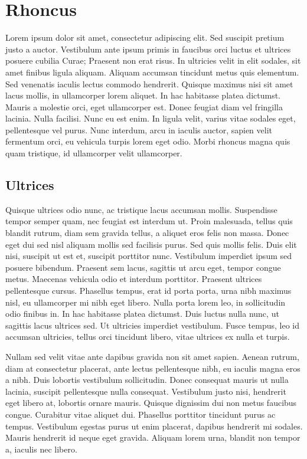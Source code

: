 \chapter{Rhoncus}

Lorem ipsum dolor sit amet, consectetur adipiscing elit. Sed suscipit pretium justo a auctor. Vestibulum ante ipsum primis in faucibus orci luctus et ultrices posuere cubilia Curae; Praesent non erat risus. In ultricies velit in elit sodales, sit amet finibus ligula aliquam. Aliquam accumsan tincidunt metus quis elementum. Sed venenatis iaculis lectus commodo hendrerit. Quisque maximus nisi sit amet lacus mollis, in ullamcorper lorem aliquet. In hac habitasse platea dictumst. Mauris a molestie orci, eget ullamcorper est. Donec feugiat diam vel fringilla lacinia. Nulla facilisi. Nunc eu est enim. In ligula velit, varius vitae sodales eget, pellentesque vel purus. Nunc interdum, arcu in iaculis auctor, sapien velit fermentum orci, eu vehicula turpis lorem eget odio. Morbi rhoncus magna quis quam tristique, id ullamcorper velit ullamcorper.

\section{Ultrices}

Quisque ultrices odio nunc, ac tristique lacus accumsan mollis. Suspendisse tempor semper quam, nec feugiat est interdum ut. Proin malesuada, tellus quis blandit rutrum, diam sem gravida tellus, a aliquet eros felis non massa. Donec eget dui sed nisl aliquam mollis sed facilisis purus. Sed quis mollis felis. Duis elit nisi, suscipit ut est et, suscipit porttitor nunc. Vestibulum imperdiet ipsum sed posuere bibendum. Praesent sem lacus, sagittis ut arcu eget, tempor congue metus. Maecenas vehicula odio et interdum porttitor. Praesent ultrices pellentesque cursus. Phasellus tempus, erat id porta porta, urna nibh maximus nisl, eu ullamcorper mi nibh eget libero. Nulla porta lorem leo, in sollicitudin odio finibus in. In hac habitasse platea dictumst. Duis luctus nulla nunc, ut sagittis lacus ultrices sed. Ut ultricies imperdiet vestibulum. Fusce tempus, leo id accumsan ultricies, tellus orci tincidunt libero, vitae ultrices ex nulla et turpis.

Nullam sed velit vitae ante dapibus gravida non sit amet sapien. Aenean rutrum, diam at consectetur placerat, ante lectus pellentesque nibh, eu iaculis magna eros a nibh. Duis lobortis vestibulum sollicitudin. Donec consequat mauris ut nulla lacinia, suscipit pellentesque nulla consequat. Vestibulum justo nisi, hendrerit eget libero at, lobortis ornare mauris. Quisque dignissim dui non metus faucibus congue. Curabitur vitae aliquet dui. Phasellus porttitor tincidunt purus ac tempus. Vestibulum egestas purus ut enim placerat, dapibus hendrerit mi sodales. Mauris hendrerit id neque eget gravida. Aliquam lorem urna, blandit non tempor a, iaculis nec libero.


